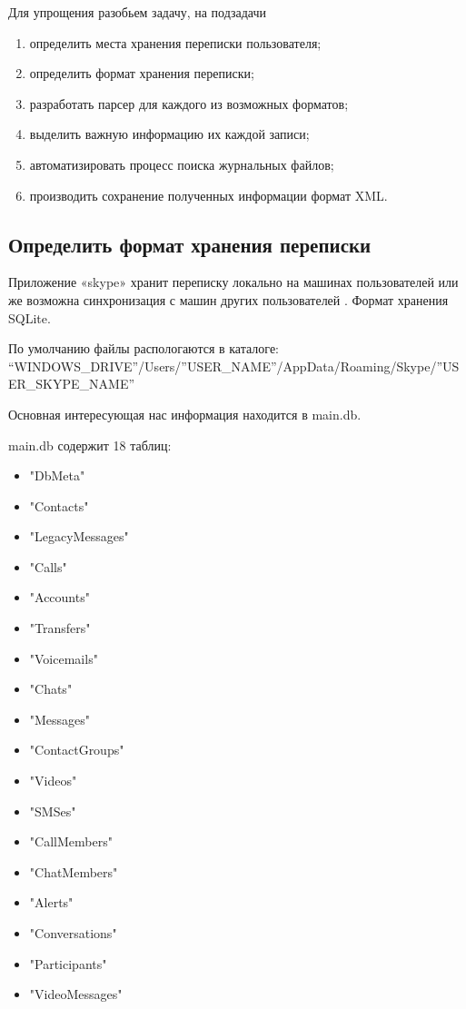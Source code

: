 Для упрощения разобьем задачу, на подзадачи

\begin{enumerate}
\item определить места хранения переписки пользователя;
\item определить формат хранения переписки;
\item разработать парсер для каждого из возможных форматов;
\item выделить важную информацию их каждой записи;
\item автоматизировать процесс поиска журнальных файлов;
\item производить сохранение полученных информации формат XML.
\end{enumerate}

\subsection{Определить формат хранения переписки}

Приложение «skype» хранит переписку локально на машинах пользователей или же возможна синхронизация с машин других пользователей \cite{skypechat}. Формат хранения SQLite. 

По умолчанию файлы распологаются в каталоге: “WINDOWS\_DRIVE”/Users/”USER\_NAME”/AppData/Roaming/Skype/”USER\_SKYPE\_NAME”

Основная интересующая нас информация находится в main.db.

main.db  содержит 18 таблиц:

\begin{itemize} 
\item"DbMeta"
\item"Contacts"
\item"LegacyMessages"
\item"Calls"
\item"Accounts"
\item"Transfers"
\item"Voicemails"
\item"Chats"
\item"Messages"   
\item"ContactGroups"
\item"Videos"
\item"SMSes"
\item"CallMembers"
\item"ChatMembers"
\item"Alerts"
\item"Conversations"
\item"Participants"
\item"VideoMessages"
\end{itemize}

